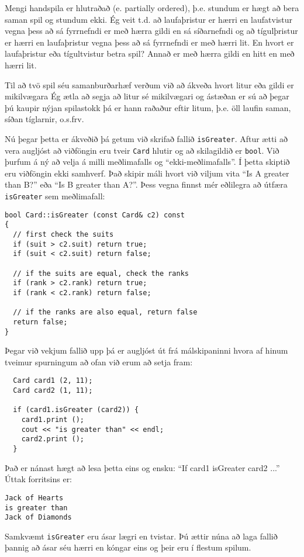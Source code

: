 Mengi handspila er hlutraðað (e. partially ordered), þ.e. stundum er hægt að bera saman spil og stundum ekki.
Ég veit t.d. að laufaþristur er hærri en laufatvistur vegna þess að sá fyrrnefndi er með hærra gildi en sá síðarnefndi
og að tígulþristur er hærri en laufaþristur vegna þess að sá fyrrnefndi er með hærri lit.
En hvort er laufaþristur eða tígultvistur betra spil?  Annað er með hærra gildi en hitt en með hærri lit.


Til að tvö spil séu samanburðarhæf verðum við að ákveða hvort litur eða gildi er mikilvægara 
Ég ætla að segja að litur sé mikilvægari og ástæðan er sú að þegar þú kaupir nýjan spilastokk þá er hann raðaður eftir litum,
þ.e. öll laufin saman, síðan tíglarnir, o.s.frv.

Nú þegar þetta er ákveðið þá getum við skrifað fallið {\tt isGreater}.
Aftur ætti að vera augljóst að viðföngin eru tveir {\tt Card} hlutir og að skilagildið er {\tt bool}.
Við þurfum á ný að velja á milli meðlimafalls og ``ekki-meðlimafalls''.
Í þetta skiptið eru viðföngin ekki samhverf.
Það skipir máli hvort við viljum vita ``Is A greater than B?'' eða ``Is B greater than A?''.
Þess vegna finnst mér eðlilegra að útfæra {\tt isGreater} sem meðlimafall:

\begin{verbatim}
bool Card::isGreater (const Card& c2) const
{
  // first check the suits
  if (suit > c2.suit) return true;
  if (suit < c2.suit) return false;

  // if the suits are equal, check the ranks
  if (rank > c2.rank) return true;
  if (rank < c2.rank) return false;

  // if the ranks are also equal, return false
  return false;
}
\end{verbatim}
%
Þegar við vekjum fallið upp þá er augljóst út frá málskipaninni hvora af hinum tveimur spurningum að ofan við erum að setja fram:

\begin{verbatim}
  Card card1 (2, 11);
  Card card2 (1, 11);

  if (card1.isGreater (card2)) {
    card1.print ();
    cout << "is greater than" << endl;
    card2.print ();
  }
\end{verbatim}
%
Það er nánast hægt að lesa þetta eins og ensku: ``If card1 isGreater card2 ...''
Úttak forritsins er:

\begin{verbatim}
Jack of Hearts
is greater than
Jack of Diamonds
\end{verbatim}
%
Samkvæmt {\tt isGreater} eru ásar lægri en tvistar. 
Þú ættir núna að laga fallið þannig að ásar séu hærri en kóngar eins og þeir eru í flestum spilum.

